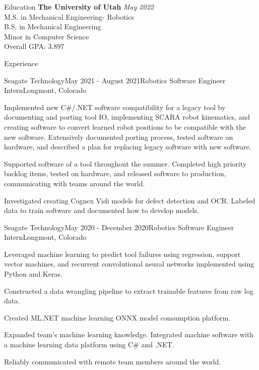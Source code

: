 \documentclass{resume}
\begin{document}
  \begin{rSection}{Education}
    {\bf The University of Utah} \hfill {\em May 2022} \\ 
    { M.S. in Mechanical Engineering- Robotics } \\
    { B.S. in Mechanical Engineering } \\
    { Minor in Computer Science } \smallskip \\
    Overall GPA: 3.897 
  \end{rSection}
  
  \begin{rSection}{Experience}
  
    \begin{rSubsection}{Seagate Technology}{May 2021 - August 2021}{Robotics Software Engineer Intern}{Longmont, Colorado}
    \item Implemented new C\#/.NET software compatibility for a legacy tool by documenting and porting tool IO, implementing SCARA robot kinematics, and creating software to convert learned robot positions to be compatible with the new software. 
    Extensively documented porting process, tested software on hardware, and described a plan for replacing legacy software with new software. 
    \item Supported software of a tool throughout the summer. Completed high priority backlog items, tested on hardware, and released software to production, communicating with teams around the world.
    \item Investigated creating Cognex Vidi models for defect detection and OCR. Labeled data to train software and documented how to develop models.
    \end{rSubsection}
  
    \begin{rSubsection}{Seagate Technology}{May 2020 - December 2020}{Robotics Software Engineer Intern}{Longmont, Colorado}
    \item Leveraged machine learning to predict tool failures using regression, support vector machines, and recurrent convolutional neural networks implemented using Python and Keras. 
    \item Constructed a data wrangling pipeline to extract trainable features from raw log data. 
    \item Created ML.NET machine learning ONNX model consumption platform.
    \item Expanded team’s machine learning knowledge. Integrated machine software with a machine learning data platform using C\# and .NET.
    \item Reliably communicated with remote team members around the world.
    \end{rSubsection}


\end{rSection}
\end{document}
